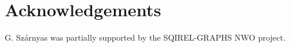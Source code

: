 \section*{Acknowledgements}


G. Sz\'arnyas was partially supported by the SQIREL-GRAPHS NWO project.
